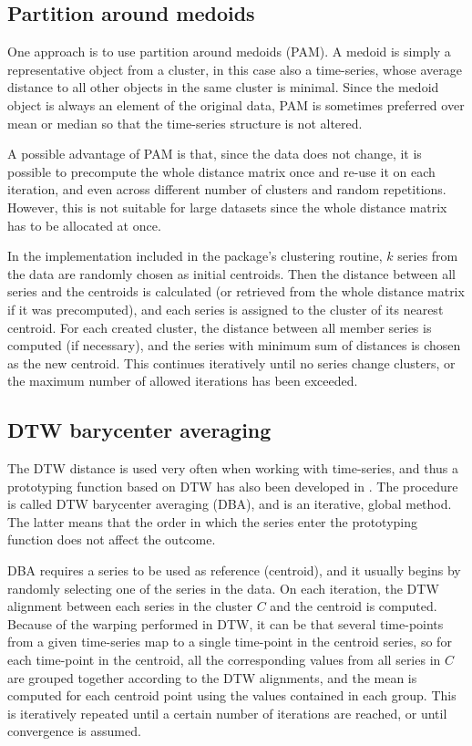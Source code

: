 \subsection{Partition around medoids}
\label{sec:pam}

One approach is to use partition around medoids (PAM).
A medoid is simply a representative object from a cluster,
in this case also a time-series,
whose average distance to all other objects in the same cluster is minimal.
Since the medoid object is always an element of the original data,
PAM is sometimes preferred over mean or median so that the time-series structure is not altered.

A possible advantage of PAM is that,
since the data does not change,
it is possible to precompute the whole distance matrix once and re-use it on each iteration,
and even across different number of clusters and random repetitions.
However, this is not suitable for large datasets since the whole distance matrix has to be allocated at once.

In the implementation included in the package's clustering routine,
$k$ series from the data are randomly chosen as initial centroids.
Then the distance between all series and the centroids is calculated
(or retrieved from the whole distance matrix if it was precomputed),
and each series is assigned to the cluster of its nearest centroid.
For each created cluster,
the distance between all member series is computed (if necessary),
and the series with minimum sum of distances is chosen as the new centroid.
This continues iteratively until no series change clusters,
or the maximum number of allowed iterations has been exceeded.

\subsection{DTW barycenter averaging}
\label{sec:dba}

The DTW distance is used very often when working with time-series,
and thus a prototyping function based on DTW has also been developed in \citet{petitjean2011}.
The procedure is called DTW barycenter averaging (DBA),
and is an iterative, global method.
The latter means that the order in which the series enter the prototyping function does not affect the outcome.

DBA requires a series to be used as reference (centroid),
and it usually begins by randomly selecting one of the series in the data.
On each iteration, the DTW alignment between each series in the cluster $C$ and the centroid is computed.
Because of the warping performed in DTW,
it can be that several time-points from a given time-series map to a single time-point in the centroid series,
so for each time-point in the centroid,
all the corresponding values from all series in $C$ are grouped together according to the DTW alignments,
and the mean is computed for each centroid point using the values contained in each group.
This is iteratively repeated until a certain number of iterations are reached,
or until convergence is assumed.


